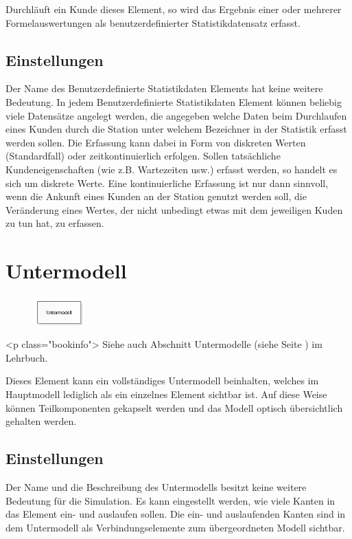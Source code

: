 Durchläuft ein Kunde dieses Element, so wird das Ergebnis einer oder mehrerer Formelauswertungen
als benutzerdefinierter Statistikdatensatz erfasst.

\subsection*{Einstellungen}

Der Name des Benutzerdefinierte Statistikdaten Elements hat keine weitere Bedeutung.
In jedem Benutzerdefinierte Statistikdaten Element können beliebig viele Datensätze
angelegt werden, die angegeben welche Daten beim Durchlaufen eines Kunden durch die
Station unter welchem Bezeichner in der Statistik erfasst werden sollen. Die Erfassung
kann dabei in Form von diskreten Werten (Standardfall) oder zeitkontinuierlich
erfolgen. Sollen tatsächliche Kundeneigenschaften (wie z.B. Wartezeiten usw.) erfasst
werden, so handelt es sich um diskrete Werte. Eine kontinuierliche Erfassung ist nur
dann sinnvoll, wenn die Ankunft eines Kunden an der Station genutzt werden soll,
die Veränderung eines Wertes, der nicht unbedingt etwas mit dem jeweiligen Kuden
zu tun hat, zu erfassen.


\section{Untermodell}
\label{ref:ModelElementSub}

\begin{figure}
\vspace{-22pt}
\includegraphics[width=2cm]{imageModelElementSub.png}
\vspace{-22pt}
\end{figure}

<p class="bookinfo">
Siehe auch Abschnitt Untermodelle (siehe Seite \pageref{ref:book:8.12.3}) im Lehrbuch.

Dieses Element kann ein vollständiges Untermodell beinhalten, welches im Hauptmodell
lediglich als ein einzelnes Element sichtbar ist. Auf diese Weise können Teilkomponenten
gekapselt werden und das Modell optisch übersichtlich gehalten werden.

\subsection*{Einstellungen}

Der Name und die Beschreibung des Untermodells besitzt keine weitere Bedeutung für die Simulation.
Es kann eingestellt werden, wie viele Kanten in das Element ein- und auslaufen sollen.
Die ein- und auslaufenden Kanten sind in dem Untermodell als Verbindungselemente zum
übergeordneten Modell sichtbar.





